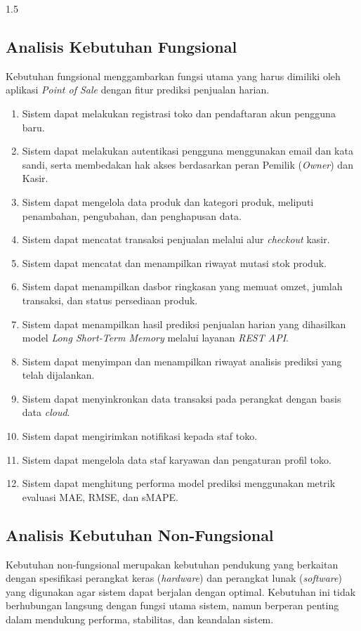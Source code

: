 \documentclass[12pt, a4paper, onecolumn, oneside]{report}
\begin{document}
\begin{spacing}{1.5}
\subsection{Analisis Kebutuhan Fungsional}

Kebutuhan fungsional menggambarkan fungsi utama yang harus dimiliki oleh aplikasi \textit{Point of Sale} dengan fitur prediksi penjualan harian.
\begin{enumerate}
    \item Sistem dapat melakukan registrasi toko dan pendaftaran akun pengguna baru.
    \item Sistem dapat melakukan autentikasi pengguna menggunakan email dan kata sandi, serta membedakan hak akses berdasarkan peran Pemilik (\textit{Owner}) dan Kasir.
    \item Sistem dapat mengelola data produk dan kategori produk, meliputi penambahan, pengubahan, dan penghapusan data.
    \item Sistem dapat mencatat transaksi penjualan melalui alur \textit{checkout} kasir.
    \item Sistem dapat mencatat dan menampilkan riwayat mutasi stok produk.
    \item Sistem dapat menampilkan dasbor ringkasan yang memuat omzet, jumlah transaksi, dan status persediaan produk.
    \item Sistem dapat menampilkan hasil prediksi penjualan harian yang dihasilkan model \textit{Long Short-Term Memory} melalui layanan \textit{REST API}.
    \item Sistem dapat menyimpan dan menampilkan riwayat analisis prediksi yang telah dijalankan.
    \item Sistem dapat menyinkronkan data transaksi pada perangkat dengan basis data \textit{cloud}.
    \item Sistem dapat mengirimkan notifikasi kepada staf toko.
    \item Sistem dapat mengelola data staf karyawan dan pengaturan profil toko.
    \item Sistem dapat menghitung performa model prediksi menggunakan metrik evaluasi MAE, RMSE, dan sMAPE.
\end{enumerate}

\subsection{Analisis Kebutuhan Non-Fungsional}

Kebutuhan non-fungsional merupakan kebutuhan pendukung yang berkaitan dengan spesifikasi perangkat keras (\textit{hardware}) dan perangkat lunak (\textit{software}) yang digunakan agar sistem dapat berjalan dengan optimal. Kebutuhan ini tidak berhubungan langsung dengan fungsi utama sistem, namun berperan penting dalam mendukung performa, stabilitas, dan keandalan sistem.


\end{spacing}
\end{document}
